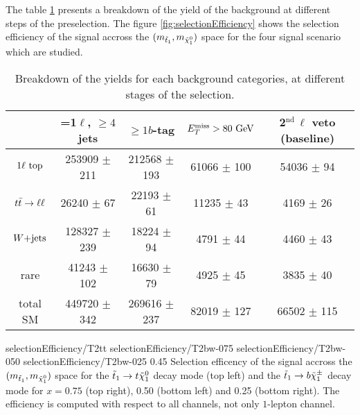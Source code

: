         The table \ref{tab:cutflowPreselection} presents a breakdown of the yield of the background at different steps of the
        preselection. The figure \ref{fig:selectionEfficiency} shows the selection efficiency of the signal accross the $(m_{\tilde{t}_1},
        m_{\tilde{\chi}_1^0})$ space for the four signal scenario which are studied. 

        \begin{table}[h!]
            \hspace*{-0.7cm}
            \begin{tabular}{|c|cccc|}
                \hline
                                 & =1$\ell$, $\geq 4$ jets   & $\geq 1b$-tag      & $E_T^\text{miss} > 80 ~\text{GeV}$  &  2$^\text{nd}\, \ell$ veto (baseline) \\
                \hline
                $1\ell~\text{top}$  & 253909 $\pm$ 211          & 212568 $\pm$ 193   &  61066 $\pm$ 100  & 54036 $\pm$ 94     \\
                $t\bar{t} \rightarrow \ell \ell$   &  26240 $\pm$ 67           &  22193 $\pm$ 61    &  11235 $\pm$ 43   &  4169 $\pm$ 26     \\
                $\text{$W$+jets}$         & 128327 $\pm$ 239          &  18224 $\pm$ 94    &   4791 $\pm$ 44   &  4460 $\pm$ 43     \\
                rare             &  41243 $\pm$ 102          &  16630 $\pm$ 79    &   4925 $\pm$ 45   &  3835 $\pm$ 40     \\
                \hline                                                            
                total SM         & 449720 $\pm$ 342          & 269616 $\pm$ 237   &  82019 $\pm$ 127  & 66502 $\pm$ 115    \\
                \hline
            \end{tabular}
            \caption{Breakdown of the yields for each background categories, at different stages of the selection.}
            \label{tab:cutflowPreselection}
        \end{table}

                          {selectionEfficiency/T2tt}
                          {selectionEfficiency/T2bw-075}
                          {selectionEfficiency/T2bw-050}
                          {selectionEfficiency/T2bw-025}
                          {0.45}
                          {Selection efficency of the signal accross the $(m_{\tilde{t}_1},m_{\tilde{\chi}_1^0})$ space for the $\tilde{t}_1 \rightarrow t \tilde{\chi}_1^0$ decay mode (top left) and the $\tilde{t}_1 \rightarrow b \tilde{\chi}_1^\pm$ decay mode for $x = 0.75$ (top right), 0.50 (bottom left) and 0.25 (bottom right). The efficiency is computed with respect to all channels, not only $1$-lepton channel.}


